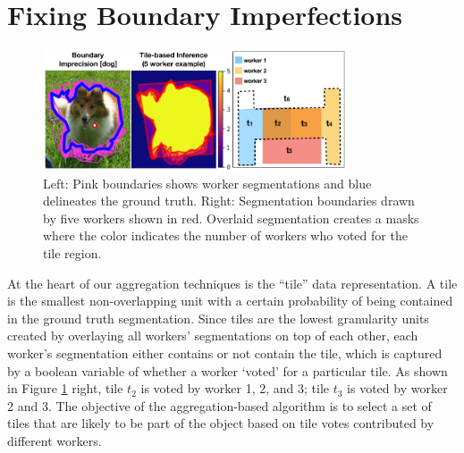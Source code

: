 \vspace{-15pt}
\section{Fixing Boundary Imperfections\label{precision}}%
\begin{figure}[h!]
\vspace{-10pt}
\centering
\includegraphics[width=0.8\textwidth]{plots/precision_issue_tile_example.png}
\caption{Left: Pink boundaries shows worker segmentations and blue delineates the ground truth. Right: Segmentation boundaries drawn by five workers shown in red. Overlaid segmentation creates a masks where the color indicates the number of workers who voted for the tile region.}
\label{tile_demo}
\end{figure}

At the heart of our aggregation techniques is the ``tile'' data representation. A tile is the smallest non-overlapping unit with a certain probability of being contained in the ground truth segmentation. Since tiles are the lowest granularity units created by overlaying all workers' segmentations on top of each other, each worker's segmentation either contains or not contain the tile, which is captured by a boolean variable of whether a worker `voted' for a particular tile. As shown in Figure \ref{tile_demo} right, tile $t_2$ is voted by worker 1, 2, and 3; tile $t_3$ is voted by  worker 2 and 3. The objective of the aggregation-based algorithm is to select a set of tiles that are likely to be part of the object based on tile votes contributed by different workers.

